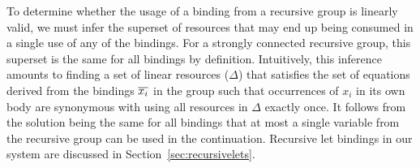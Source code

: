 \documentclass[acmsmall,review,anonymous,screen]{acmart}
\newcommand{\incode}[1]{\lstinline{#1}}
\newcommand{\lolli}{\multimap}
\begin{document}
%

To determine whether the usage of a binding from a recursive group is linearly
valid, we must infer the superset of resources that may end up being consumed
in a single use of any of the bindings. For a strongly connected recursive
group, this superset is the same for all bindings by definition.
%
Intuitively, this inference amounts to finding a set of linear resources
($\Delta$) that satisfies the set of equations derived from the bindings
$\overline{x_i}$ in the group such that
occurrences of $x_i$ in its own body are synonymous with using all resources in $\Delta$ exactly once.
%
It follows from the solution being the same for all bindings that
at most a single variable from the recursive group can be used in the continuation.
%
Recursive let bindings in our system are discussed in Section~\ref{sec:recursivelets}.

\end{document}
